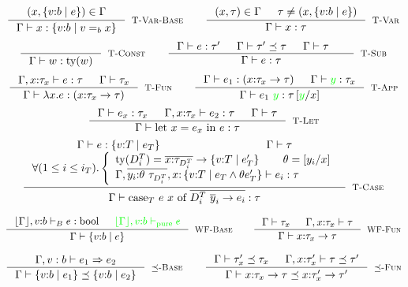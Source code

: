 \hfill\mbox{}
{}
$$
\inference{
	(x,\tref{v}{b}{e}) \in \Gamma
}{
	\hastype{\Gamma}{x}{\tref{v}{b}{v \eqb{b} x}}
}[\rtvarbase]
\qquad
\inference{
	(x,\tau) \in \Gamma &&
	\tau \neq (x,\tref{v}{b}{e})
}{
	\hastype{\Gamma}{x}{\tau}
}[\rtvar]
$$
$$
\inference{
}{
	\hastype{\Gamma}{w}{\ty{w}}
}[\rtconst]
\qquad
\inference{
	\hastype{\Gamma}{e}{\tau'} &&
	\issubtype{\Gamma}{\tau'}{\tau} &&
	\iswellformed{\Gamma}{\tau} &&
}{
	\hastype{\Gamma}{e}{\tau}
}[\rtsub]
$$
$$
\inference{
	\hastype{\Gamma, x\colon\tau_x}{e}{\tau} &&
	\iswellformed{\Gamma}{\tau_x}
}{
	\hastype{\Gamma}{\efun{x}{e}}{(\tfun{x}{\tau_x}{\tau})}
}[\rtfun]
\qquad
\inference{
	\hastype{\Gamma}{e_1}{(\tfunref{x}{\tau_{x}}{\tau}{v}{e_v})} &&
	\hastype{\Gamma}{\restrictdecidable{y}{e_2}}{\tau_{x}}
}{
	\hastype{\Gamma}{\eapp{e_1}{\restrictdecidable{y}{e_2}}}{\tau\sub{x}{\restrictdecidable{y}{e_2}}}
}[\rtapp]
$$
$$
\inference{
	\hastype{\Gamma}{e_x}{\tau_{x}} &&
	\hastype{\Gamma,x\colon\tau_x}{e_2}{\tau} &&
	\iswellformed{\Gamma}{\tau}
}{
	\hastype{\Gamma}{\elet{x}{e_x}{e}}{\tau}
}[\rtlet]
$$
$$
\inference{
	\hastype{\Gamma}{e}{\tref{v}{T}{e_T}} && \iswellformed{\Gamma}{\tau}\\
	\tforalli{T}. \left\lbrace
	\begin{array}{ll}
 	\ty{\dcti} = \overline{x\colon\tau_{\dcti}}\rightarrow \tref{v}{T}{e'_T} \qquad
 	\theta = \sub{x}{y_i} \cr
	\hastype{\Gamma, \overline{y_i\colon\theta\ \tau_{\dcti}}, 
				x\colon \tref{v}{T}{e_T \land \theta e'_T}
				}{e_i}{\tau}
	\end{array} \right.
}{
	\hastype{\Gamma}{\ecase{e}{x}{\dcti}{\overline{y}_i}{e_i}}{\tau}
}[\rtcase]
$$

\hfill\mbox{\iswellformed{\Gamma}{\tau}}
$$
\inference{
	\hastypebase{\erase{\Gamma}, v\colon b}{e}{\tbool} &&
	\restrictdecidable{\ispure{\erase{\Gamma},v\colon b}{e}}{}
}{
	\iswellformed{\Gamma}{\tref{v}{b}{e}}
}[\rwbase]
\qquad
\inference{
	\iswellformed{\Gamma}{\tau_x} &&
	\iswellformed{\Gamma, x \colon \tau_x}{\tau}
}{
	\iswellformed{\Gamma}{\tfunref{x}{\tau_x}{\tau}{v}{e}}
}[\rwfun]
$$

\hfill\mbox{\issubtype{\Gamma}{\tau}{\tau}}
$$
\inference{
	\issubref{\Gamma, v:b}{e_1}{e_2}
}{
	\issubtype{\Gamma}{\tref{v}{b}{e_1}}{\tref{v}{b}{e_2}}
}[\rsubbase]
\qquad
\inference{
	\issubtype{\Gamma}{\tau'_x}{\tau_x} &&
	\issubtype{\Gamma, x \colon \tau'_x}{\tau}{\tau'}
}{
	\issubtype{\Gamma}{\tfunref{x}{\tau_x}{\tau}{v}{e_1}}{\tfunref{x}{\tau'_x}{\tau'}{v}{e_2}}
}[\rsubfun]
$$

